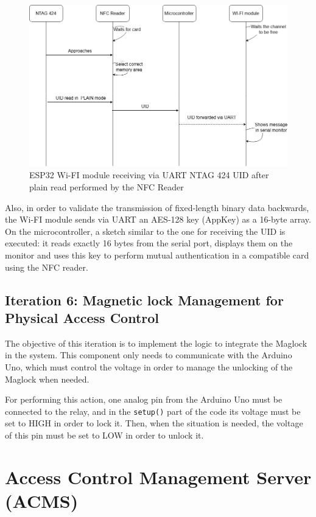 \begin{figure}[htbp]
	\centering
	\includegraphics[width=\textwidth]{imaxes/FINALFLOW} %
	\caption{ESP32 Wi-FI module receiving via UART NTAG 424 UID after plain read performed by the NFC Reader}
	\label{fig:5.13}
\end{figure}

Also, in order to validate the transmission of fixed-length binary data backwards, the Wi-FI module sends via UART an AES-128 key (AppKey) as a 16-byte array. On the microcontroller, a sketch similar to the one for receiving the UID is executed: it reads exactly 16 bytes from the serial port, displays them on the monitor and uses this key to perform mutual authentication in a compatible card using the NFC reader. 


\subsection{Iteration 6: Magnetic lock Management for Physical Access Control}

The objective of this iteration is to implement the logic to integrate the Maglock in the system. This component only needs to communicate with the Arduino Uno, which must control the voltage in order to manage the unlocking of the Maglock when needed.

For performing this action, one analog pin from the Arduino Uno must be connected to the relay, and in the \texttt{setup()} part of the code its voltage must be set to HIGH in order to lock it. Then, when the situation is needed, the voltage of this pin must be set to LOW in order to unlock it.


\section{Access Control Management Server (ACMS)}
\label{sec:ACMS}

